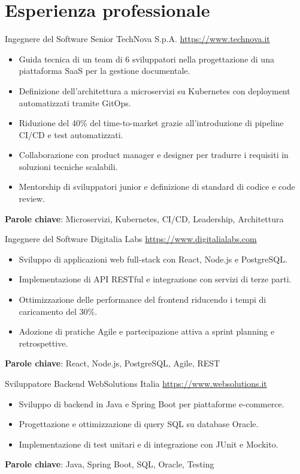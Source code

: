 \documentclass[a4paper, serif, 10pt]{moderncv}
\begin{document}
\section{Esperienza professionale}

        {Ingegnere del Software Senior}
        {TechNova S.p.A.}
        {\url{https://www.technova.it}}
        {}
        {\begin{itemize}
\item Guida tecnica di un team di 6 sviluppatori nella progettazione di una piattaforma SaaS per la gestione documentale.
\item Definizione dell'architettura a microservizi su Kubernetes con deployment automatizzati tramite GitOps.
\item Riduzione del 40\% del time-to-market grazie all'introduzione di pipeline CI/CD e test automatizzati.
\item Collaborazione con product manager e designer per tradurre i requisiti in soluzioni tecniche scalabili.
\item Mentorship di sviluppatori junior e definizione di standard di codice e code review.
\end{itemize}
\textbf{Parole chiave}: Microservizi, Kubernetes, CI/CD, Leadership, Architettura}

        {Ingegnere del Software}
        {Digitalia Labs}
        {\url{https://www.digitalialabs.com}}
        {}
        {\begin{itemize}
\item Sviluppo di applicazioni web full-stack con React, Node.js e PostgreSQL.
\item Implementazione di API RESTful e integrazione con servizi di terze parti.
\item Ottimizzazione delle performance del frontend riducendo i tempi di caricamento del 30\%.
\item Adozione di pratiche Agile e partecipazione attiva a sprint planning e retrospettive.
\end{itemize}
\textbf{Parole chiave}: React, Node.js, PostgreSQL, Agile, REST}

        {Sviluppatore Backend}
        {WebSolutions Italia}
        {\url{https://www.websolutions.it}}
        {}
        {\begin{itemize}
\item Sviluppo di backend in Java e Spring Boot per piattaforme e-commerce.
\item Progettazione e ottimizzazione di query SQL su database Oracle.
\item Implementazione di test unitari e di integrazione con JUnit e Mockito.
\end{itemize}
\textbf{Parole chiave}: Java, Spring Boot, SQL, Oracle, Testing}
\end{document}
